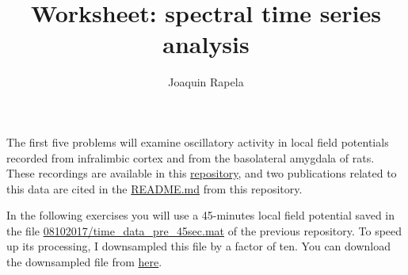 \documentclass[12pt]{article}
\title{Worksheet: spectral time series analysis}
\author{Joaquin Rapela}
\begin{document}
\maketitle

The first five problems will examine oscillatory activity in local field
potentials recorded from infralimbic cortex and from the basolateral amygdala
of rats. These recordings are available in this
\href{https://github.com/tne-lab/cl-example-data}{repository}, and two
publications related to this data are cited in the
\href{https://github.com/tne-lab/cl-example-data/README.md}{README.md} from
this repository.

In the following exercises you will use a 45-minutes local field potential
saved in the file
\href{https://github.com/tne-lab/cl-example-data/blob/master/08102017/time_data_pre_45sec.mat}{08102017/time\_data\_pre\_45sec.mat}
of the previous repository.
To speed up its processing, I downsampled this file
by a factor of ten.
You can download the downsampled file from
\href{https://www.gatsby.ucl.ac.uk/~rapela/statNeuro/2025/lectures/03_spectralTimeSeriesAnalysis/data/time_data_pre_45sec_ds10_v6.mat}{here}.
\end{document}
